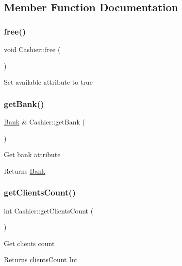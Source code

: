 \subsection{Member Function Documentation}
\mbox{\label{classCashier_ac04b7595d1d7e51dd673590809cb5682}} 
\subsubsection{\texorpdfstring{free()}{free()}}
{\footnotesize\ttfamily void Cashier\+::free (\begin{DoxyParamCaption}{ }\end{DoxyParamCaption})}

Set available attribute to true \mbox{\label{classCashier_aa60d8270fa27302302b80a810c53a8f9}} 
\subsubsection{\texorpdfstring{get\+Bank()}{getBank()}}
{\footnotesize\ttfamily \hyperlink{classBank}{Bank} \& Cashier\+::get\+Bank (\begin{DoxyParamCaption}{ }\end{DoxyParamCaption})}

Get bank attribute \begin{DoxyReturn}{Returns}
\hyperlink{classBank}{Bank} 
\end{DoxyReturn}
\mbox{\label{classCashier_a50d3d5779132b3806958d0e57aea7a34}} 
\subsubsection{\texorpdfstring{get\+Clients\+Count()}{getClientsCount()}}
{\footnotesize\ttfamily int Cashier\+::get\+Clients\+Count (\begin{DoxyParamCaption}{ }\end{DoxyParamCaption})}

Get clients count \begin{DoxyReturn}{Returns}
clients\+Count Int 
\end{DoxyReturn}
\mbox{\label{classCashier_ac0c91ebe2a9ca9428537e79b82bfbe9f}} 
